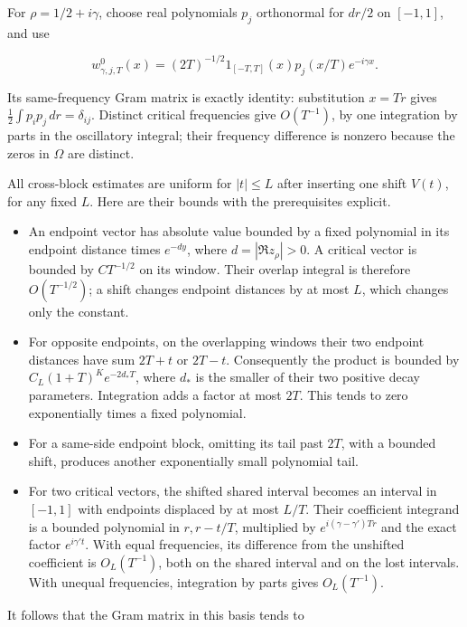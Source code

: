 For \(\rho=1/2+i\gamma\), choose real polynomials \(p_j\) orthonormal
for \(dr/2\) on \([-1,1]\), and use

\[
 w^0_{\gamma,j,T}(x)=(2T)^{-1/2}1_{[-T,T]}(x)
 p_j(x/T)e^{-i\gamma x}.
\tag{FGC3.2}
\]

Its same-frequency Gram matrix is exactly identity: substitution
\(x=Tr\) gives \(\frac12\int p_i p_j\,dr=\delta_{ij}\). Distinct
critical frequencies give \(O(T^{-1})\), by one integration by parts in
the oscillatory integral; their frequency difference is nonzero because
the zeros in \(\Omega\) are distinct.

All cross-block estimates are uniform for \(|t|\leq L\) after inserting
one shift \(V(t)\), for any fixed \(L\). Here are their bounds with the
prerequisites explicit.

\begin{itemize}
\tightlist
\item
  An endpoint vector has absolute value bounded by a fixed polynomial in
  its endpoint distance times \(e^{-d y}\), where \(d=|\Re z_\rho|>0\).
  A critical vector is bounded by \(C T^{-1/2}\) on its window. Their
  overlap integral is therefore \(O(T^{-1/2})\); a shift changes
  endpoint distances by at most \(L\), which changes only the constant.
\item
  For opposite endpoints, on the overlapping windows their two endpoint
  distances have sum \(2T+t\) or \(2T-t\). Consequently the product is
  bounded by \(C_L(1+T)^K e^{-2d_*T}\), where \(d_*\) is the smaller of
  their two positive decay parameters. Integration adds a factor at most
  \(2T\). This tends to zero exponentially times a fixed polynomial.
\item
  For a same-side endpoint block, omitting its tail past \(2T\), with a
  bounded shift, produces another exponentially small polynomial tail.
\item
  For two critical vectors, the shifted shared interval becomes an
  interval in \([-1,1]\) with endpoints displaced by at most \(L/T\).
  Their coefficient integrand is a bounded polynomial in \(r,r-t/T\),
  multiplied by \(e^{i(\gamma-\gamma')Tr}\) and the exact factor
  \(e^{i\gamma't}\). With equal frequencies, its difference from the
  unshifted coefficient is \(O_L(T^{-1})\), both on the shared interval
  and on the lost intervals. With unequal frequencies, integration by
  parts gives \(O_L(T^{-1})\).
\end{itemize}

It follows that the Gram matrix in this basis tends to

